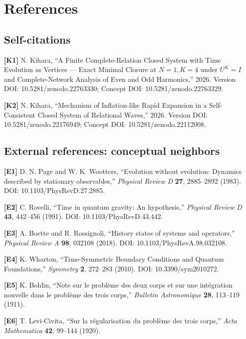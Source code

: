 \documentclass[
  a4paper,
]{article}
\begin{document}
\section{References}\label{references}

\subsection{Self-citations}\label{self-citations}

\textbf{{[}K1{]}} N. Kihara, ``A Finite Complete-Relation Closed System
with Time Evolution as Vertices --- Exact Minimal Closure at \(N=1,K=4\)
under \(U^K=I\) and Complete-Network Analysis of Even and Odd
Harmonics,'' 2026. Version DOI: 10.5281/zenodo.22763330; Concept DOI:
10.5281/zenodo.22763329.

\textbf{{[}K2{]}} N. Kihara, ``Mechanism of Inflation-like Rapid
Expansion in a Self-Consistent Closed System of Relational Waves,''
2026. Version DOI: 10.5281/zenodo.22176949; Concept DOI:
10.5281/zenodo.22112008.

\subsection{External references: conceptual
neighbors}\label{external-references-conceptual-neighbors}

\textbf{{[}E1{]}} D. N. Page and W. K. Wootters, ``Evolution without
evolution: Dynamics described by stationary observables,''
\emph{Physical Review D} \textbf{27}, 2885--2892 (1983). DOI:
10.1103/PhysRevD.27.2885.

\textbf{{[}E2{]}} C. Rovelli, ``Time in quantum gravity: An
hypothesis,'' \emph{Physical Review D} \textbf{43}, 442--456 (1991).
DOI: 10.1103/PhysRevD.43.442.

\textbf{{[}E3{]}} A. Boette and R. Rossignoli, ``History states of
systems and operators,'' \emph{Physical Review A} \textbf{98}, 032108
(2018). DOI: 10.1103/PhysRevA.98.032108.

\textbf{{[}E4{]}} K. Wharton, ``Time-Symmetric Boundary Conditions and
Quantum Foundations,'' \emph{Symmetry} \textbf{2}, 272--283 (2010). DOI:
10.3390/sym2010272.

\textbf{{[}E5{]}} K. Bohlin, ``Note sur le problème des deux corps et
sur une intégration nouvelle dans le problème des trois corps,''
\emph{Bulletin Astronomique} \textbf{28}, 113--119 (1911).

\textbf{{[}E6{]}} T. Levi-Civita, ``Sur la régularisation du problème
des trois corps,'' \emph{Acta Mathematica} \textbf{42}, 99--144 (1920).
\end{document}
